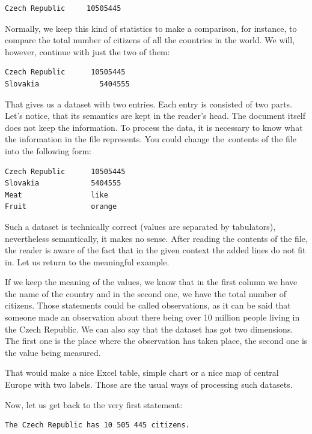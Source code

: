 \begin{verbatim}
Czech Republic     10505445
\end{verbatim}

Normally, we keep this kind of statistics to make a comparison, 
for instance, to compare the total number of citizens of all the countries in the world.
We will, however, continue with just the two of them:

\begin{verbatim}
Czech Republic	    10505445
Slovakia	          5404555
\end{verbatim}

That gives us a dataset with two entries. Each entry is consisted of two parts. Let’s notice, that 
its semantics are kept in the reader's head. The document itself does not keep the information.
To process the data, it is necessary to know what the information in the file represents. You could change
the~contents of the file into the following form:

\begin{verbatim}
Czech Republic      10505445
Slovakia            5404555
Meat                like
Fruit               orange
\end{verbatim}

Such a dataset is technically correct (values are separated by tabulators), nevertheless 
semantically, it makes no sense. After reading the contents of the file, the reader 
is aware of the fact that in the given context the added lines do not fit in.
Let us return to the meaningful example.

If we keep the meaning of the values, we know that in the first column we have the name
of the country and in the second one, we have the total number of citizens. Those statements
could be called observations, as it can be said that someone made an observation 
about there being over 10 million people living in the Czech Republic. We can also say that the
dataset has got two dimensions. The first one is the place where the observation has taken
place, the second one is the value being measured.

That would make a nice Excel table, simple chart or a nice map of central Europe with
two labels. Those are the usual ways of processing such datasets.

Now, let us get back to the very first statement:

\begin{verbatim}
The Czech Republic has 10 505 445 citizens.
\end{verbatim}

